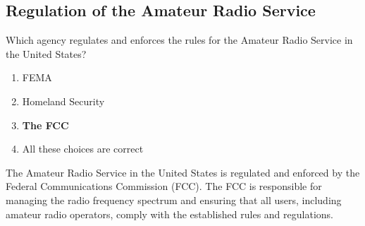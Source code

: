 \subsection{Regulation of the Amateur Radio Service}
\label{T1A02}

\begin{tcolorbox}[colback=gray!10!white,colframe=black!75!black,title=T1A02]
Which agency regulates and enforces the rules for the Amateur Radio Service in the United States?
\begin{enumerate}[label=\Alph*),noitemsep]
    \item FEMA
    \item Homeland Security
    \item \textbf{The FCC}
    \item All these choices are correct
\end{enumerate}
\end{tcolorbox}

The Amateur Radio Service in the United States is regulated and enforced by the Federal Communications Commission (FCC). The FCC is responsible for managing the radio frequency spectrum and ensuring that all users, including amateur radio operators, comply with the established rules and regulations.